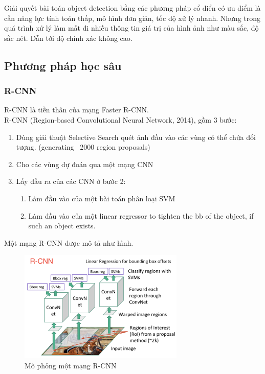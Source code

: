 \documentclass[a4paper]{report}
\begin{document}
Giải quyết bài toán object detection bằng các phương pháp cổ điển có ưu điểm là cần năng lực tính toán thấp, mô hình đơn giản, tốc độ xử lý nhanh. Nhưng trong quá trình xử lý làm mất đi nhiều thông tin giá trị của hình ảnh như màu sắc, độ sắc nét. Dẫn tới độ chính xác không cao.

\subsection{Phương pháp học sâu}
\subsubsection{R-CNN}
R-CNN là tiền thân của mạng Faster R-CNN. \\

R-CNN (Region-based Convolutional Neural Network, 2014), gồm 3 bước:
\begin{enumerate}
    \item Dùng giải thuật Selective Search quét ảnh đầu vào các vùng có thể chứa đối tượng. (generating ~2000 region proposals)
    \item Cho các vùng dự đoán qua một mạng CNN
	\item Lấy đầu ra của các CNN ở bước 2:
	\begin{enumerate}
        \item Làm đầu vào của một bài toán phân loại SVM
        \item Làm đầu vào của một linear regressor to tighten the bb of the object, if such an object exists.
	\end{enumerate}
\end{enumerate}

Một mạng R-CNN được mô tả như hình.
\begin{figure}[h!]
	\centering
	\includegraphics[width=0.7\textwidth]{2_rcnn.png}
	\caption{Mô phỏng một mạng R-CNN \cite{detectionoverview}}
	\end{figure}
\end{document}
